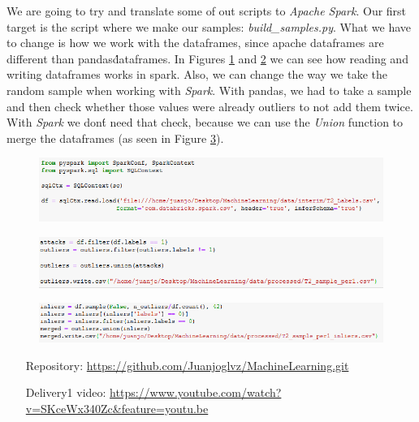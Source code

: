 \documentclass[idxtotoc,hyperref,openany]{labbook} %
\begin{document}
We are going to try and translate some of out scripts to \textit{Apache Spark}. Our first target is the script where we make our samples: \textit{build\_samples.py}. What we have to change is how we work with the dataframes, since apache dataframes are different than pandas\' dataframes. In Figures \ref{leer Spark} and \ref{escribir Spark} we can see how reading and writing dataframes works in spark. Also, we can change the way we take the random sample when working with \textit{Spark}. With pandas, we had to take a sample and then check whether those values were already outliers to not add them twice. With \textit{Spark} we don\'t need that check, because we can use the \textit{Union} function to merge the dataframes (as seen in Figure \ref{sample Spark}).



\begin{figure}[h]
\includegraphics[width=0.9\linewidth]{Milestone3/Spark/leer.png}
\setlength\belowcaptionskip{-10pt}
\caption{}
\label{leer Spark}
\end{figure}
\begin{figure}[h]
\includegraphics[width=0.9\linewidth]{Milestone3/Spark/escribir.png}
\setlength\belowcaptionskip{-10pt}
\caption{}
\label{escribir Spark}
\end{figure}
\begin{figure}[h]
\includegraphics[width=0.9\linewidth]{Milestone3/Spark/sample.png}
\setlength\belowcaptionskip{-10pt}
\caption{}
\label{sample Spark}
\end{figure}


\begin{itemize}
\item[Repository:] \href{https://github.com/Juanjoglvz/MachineLearning.git}{https://github.com/Juanjoglvz/MachineLearning.git}
\item[Delivery1 video:] \href{https://www.youtube.com/watch?v=SKceWx340Zc\&feature=youtu.be}{https://www.youtube.com/watch?v=SKceWx340Zc\&feature=youtu.be}
\end{itemize}
\end{document}
